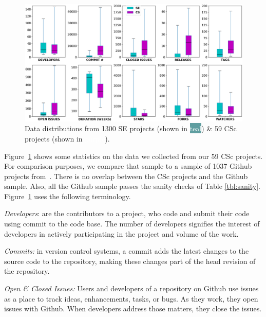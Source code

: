 \documentclass[conference,10pt]{IEEEtran}
\begin{document}
\begin{figure}[!t]
\centering \includegraphics[width=.975\linewidth]{img/Figure_1.png}

\caption{Data distributions from 1300 SE projects (shown in \colorbox{cadetblue}{ \textcolor{white}{teal}}) \& 59 CSc projects (shown in \colorbox{amethyst}{ \textcolor{white}{purple}}).}\label{fig:comparison}
\vspace{-13pt}
\end{figure}    



Figure~\ref{fig:comparison} shows some statistics on the data we collected from our 59 CSc projects. For comparison purposes, we compare that sample to 
a sample of 1037 Github projects from~\cite{Majumder19}.
There is no overlap between the CSc projects and the Github sample. Also, all the Github
sample passes the sanity checks of Table \ref{tbl:sanity}. Figure~\ref{fig:comparison} uses the following terminology.


\textit{Developers}: are the contributors to a project, who code and submit their code using commit to the code base. The number of developers signifies the interest of developers in actively participating in the project and volume of the work.
  
  

\textit{Commits:} in version control systems, a commit adds the latest changes to the source code to the repository, making these changes part of the head revision of the repository. 

\textit{Open \& Closed Issues:} Users and developers of a repository on Github use issues as a place to track ideas, enhancements, tasks, or bugs. As they work, they open issues with Github. When developers address those matters, they close the issues.
\end{document}
